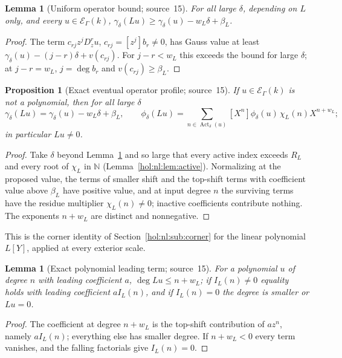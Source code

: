 \documentclass[11pt]{article}
\numberwithin{equation}{section}
\newtheorem{lemma}[theorem]{Lemma}
\newtheorem{proposition}[theorem]{Proposition}
\theoremstyle{definition}
\theoremstyle{remark}
\newcommand{\N}{\mathbb N}
\newcommand{\EK}{\mathcal E_\Gamma(k)}
\begin{document}
\begin{lemma}[Uniform operator bound; source~15]
\label{hol:pc:lem:operatorupper}
For all large $\delta$, depending on $L$ only, and every $u\in\EK$,
$\gamma_\delta(Lu)\ge\gamma_\delta(u)-w_L\delta+\beta_L$.
\end{lemma}

\begin{proof}
The term $c_{rj}z^jD_z^ru$, $c_{rj}=[z^j]b_r\ne0$, has Gauss value at least
$\gamma_\delta(u)-(j-r)\delta+v(c_{rj})$. For $j-r<w_L$ this exceeds the bound
for large $\delta$; at $j-r=w_L$, $j=\deg b_r$ and $v(c_{rj})\ge\beta_L$.
\end{proof}

\begin{proposition}[Exact eventual operator profile; source~15]
\label{hol:pc:prop:operatorexact}
If $u\in\EK$ is not a polynomial, then for all large $\delta$
\[
 \gamma_\delta(Lu)=\gamma_\delta(u)-w_L\delta+\beta_L,\qquad
 \phi_\delta(Lu)=\sum_{n\in\operatorname{Act}_\delta(u)}[X^n]\phi_\delta(u)\,
 \chi_L(n)X^{n+w_L};
\]
in particular $Lu\ne0$.
\end{proposition}

\begin{proof}
Take $\delta$ beyond Lemma~\ref{hol:pc:lem:operatorupper} and so large that
every active index exceeds $R_L$ and every root of $\chi_L$ in $\N$
(Lemma~\ref{hol:nl:lem:active}). Normalizing at the proposed value, the terms of
smaller shift and the top-shift terms with coefficient value above $\beta_L$
have positive value, and at input degree $n$ the surviving terms have the
residue multiplier $\chi_L(n)\ne0$; inactive coefficients contribute nothing.
The exponents $n+w_L$ are distinct and nonnegative.
\end{proof}

This is the corner identity of Section~\ref{hol:nl:sub:corner} for the linear
polynomial $L[Y]$, applied at every exterior scale.

\begin{lemma}[Exact polynomial leading term; source~15]
\label{hol:pc:lem:polyleading}
For a polynomial $u$ of degree $n$ with leading coefficient $a$,
$\deg Lu\le n+w_L$; if $I_L(n)\ne0$ equality holds with leading coefficient
$aI_L(n)$, and if $I_L(n)=0$ the degree is smaller or $Lu=0$.
\end{lemma}

\begin{proof}
The coefficient at degree $n+w_L$ is the top-shift contribution of $az^n$,
namely $aI_L(n)$; everything else has smaller degree. If $n+w_L<0$ every term
vanishes, and the falling factorials give $I_L(n)=0$.
\end{proof}
\end{document}
